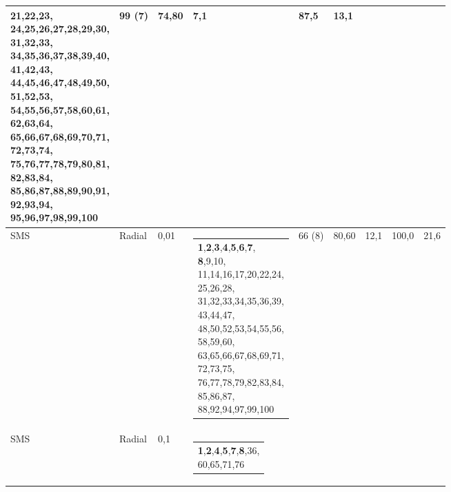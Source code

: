 \documentclass[
    12pt,
    a4paper,
    oneside,
    english,
    french,
    spanish,
    brazil
    ]{abntex2}
\makeatletter
\newcommand{\novo}[1]{\textcolor{corNova}{#1}}
\newcommand{\makecell}[2][t]{\begin{tabular}[#1]{@{}l@{}}#2\end{tabular}}
\makeatother
\begin{document}
\begin{longtable}{L{1.3cm}|L{1.3cm}|C{0.8cm}|L{4.8cm}|C{1.55cm}|C{0.95cm}|C{0.95cm}|C{0.9cm}|C{1.05cm}}
{{               21,22,23,\\
               24,25,26,27,28,29,30,\\
               31,32,33,\\
               34,35,36,37,38,39,40,\\
               41,42,43,\\
               44,45,46,47,48,49,50,\\
               51,52,53,\\
               54,55,56,57,58,60,61,\\
               62,63,64,\\
               65,66,67,68,69,70,71,\\
               72,73,74,\\
               75,76,77,78,79,80,81,\\
               82,83,84,\\
               85,86,87,88,89,90,91,\\
               92,93,94,\\
               95,96,97,98,99,100}} &
  \novo{99 (7)} & \novo{74,80} & \novo{7,1} & \novo{87,5} & \novo{13,1} \\
\hline
\novo{SMS} & \novo{Radial} & \novo{0,01} &
  \novo{\makecell[l]{\textbf{1},\textbf{2},\textbf{3},\textbf{4},\textbf{5},\textbf{6},\textbf{7},\\
               \textbf{8},9,10,\\
               11,14,16,17,20,22,24,\\
               25,26,28,\\
               31,32,33,34,35,36,39,\\
               43,44,47,\\
               48,50,52,53,54,55,56,\\
               58,59,60,\\
               63,65,66,67,68,69,71,\\
               72,73,75,\\
               76,77,78,79,82,83,84,\\
               85,86,87,\\
               88,92,94,97,99,100}} &
  \novo{66 (8)} & \novo{80,60} & \novo{12,1} & \novo{100,0} & \novo{21,6} \\
\hline
\novo{SMS} & \novo{Radial} & \novo{0,1} &
  \novo{\makecell[l]{\textbf{1},\textbf{2},\textbf{4},\textbf{5},\textbf{7},\textbf{8},36,\\
               60,65,71,76}} &

\end{longtable}
\end{document}
